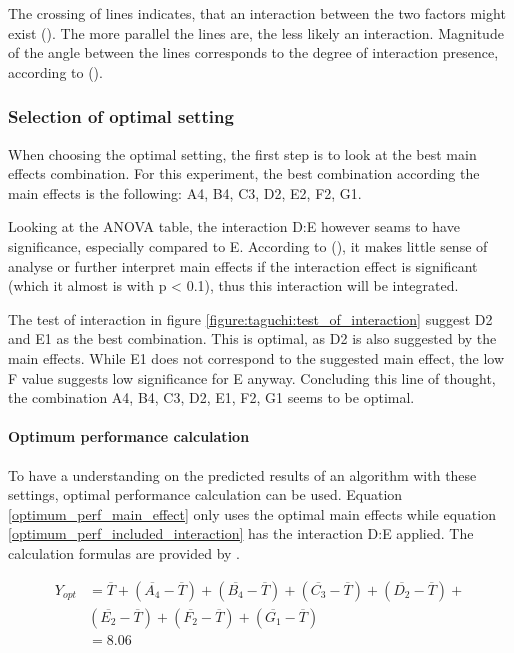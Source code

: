 The crossing of lines indicates, that an interaction between the two factors might exist (\cite{field_discovering_2012}). The more parallel the lines are, the less likely an interaction. Magnitude of the angle between the lines corresponds to the degree of interaction presence, according to (\cite{roy_primer_1990}).

\subsubsection{Selection of optimal setting}
When choosing the optimal setting, the first step is to look at the best main effects combination. For this experiment, the best combination according the main effects is the following: A4, B4, C3, D2, E2, F2, G1.

Looking at the ANOVA table, the interaction D:E however seams to have significance, especially compared to E. According to (\cite{field_discovering_2012}), it makes little sense of analyse or further interpret main effects if the interaction effect is significant (which it almost is with p < 0.1), thus this interaction will be integrated.

The test of interaction in figure \ref{figure:taguchi:test_of_interaction} suggest D2 and E1 as the best combination. This is optimal, as D2 is also suggested by the main effects. While E1 does not correspond to the suggested main effect, the low F value suggests low significance for E anyway. Concluding this line of thought, the combination A4, B4, C3, D2, E1, F2, G1 seems to be optimal.

\paragraph{Optimum performance calculation}
\label{para:hyperparameter_tuning:optimum_perf_caluclation}
To have a understanding on the predicted results of an algorithm with these settings, optimal performance calculation can be used. Equation \ref{optimum_perf_main_effect} only uses the optimal main effects while equation \ref{optimum_perf_included_interaction} has the interaction D:E applied. The calculation formulas are provided by \cite{roy_primer_1990}.

\begin{equation} \label{optimum_perf_main_effect}
	\begin{split}
		Y_{opt} &= \overline{T} + (\overline{A_4} - \overline{T}) + (\overline{B_4} - \overline{T}) + (\overline{C_3} - \overline{T}) + (\overline{D_2} - \overline{T}) + \\& (\overline{E_2} - \overline{T}) + (\overline{F_2} - \overline{T}) + (\overline{G_1} - \overline{T}) \\
			&= 8.06
	\end{split}
\end{equation}


